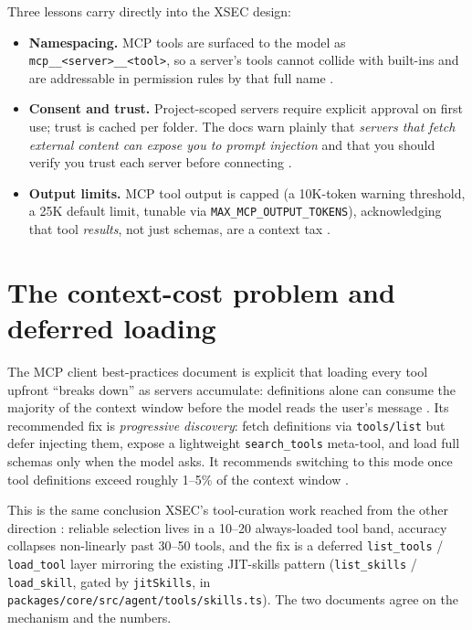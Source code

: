 \documentclass[11pt]{article}
\begin{document}
Three lessons carry directly into the XSEC design:
\begin{itemize}[leftmargin=*]
  \item \textbf{Namespacing.} MCP tools are surfaced to the model as
  \texttt{mcp\_\_<server>\_\_<tool>}, so a server's tools cannot collide with
  built-ins and are addressable in permission rules by that full name
  \cite{claudecode-mcp}.
  \item \textbf{Consent and trust.} Project-scoped servers require explicit
  approval on first use; trust is cached per folder. The docs warn plainly that
  \emph{servers that fetch external content can expose you to prompt injection}
  and that you should verify you trust each server before connecting
  \cite{claudecode-mcp}.
  \item \textbf{Output limits.} MCP tool output is capped (a 10K-token warning
  threshold, a 25K default limit, tunable via \texttt{MAX\_MCP\_OUTPUT\_TOKENS}),
  acknowledging that tool \emph{results}, not just schemas, are a context tax
  \cite{claudecode-mcp}.
\end{itemize}

\section{The context-cost problem and deferred loading}

The MCP client best-practices document is explicit that loading every tool
upfront ``breaks down'' as servers accumulate: definitions alone can consume the
majority of the context window before the model reads the user's message
\cite{mcp-clientbp}. Its recommended fix is \emph{progressive discovery}: fetch
definitions via \texttt{tools/list} but defer injecting them, expose a
lightweight \texttt{search\_tools} meta-tool, and load full schemas only when the
model asks. It recommends switching to this mode once tool definitions exceed
roughly 1--5\% of the context window \cite{mcp-clientbp}.

This is the same conclusion XSEC's tool-curation work reached from the other
direction \cite{tool-curation}: reliable selection lives in a 10--20 always-loaded
tool band, accuracy collapses non-linearly past 30--50 tools, and the fix is a
deferred \texttt{list\_tools} / \texttt{load\_tool} layer mirroring the existing
JIT-skills pattern (\texttt{list\_skills} / \texttt{load\_skill}, gated by
\texttt{jitSkills}, in \texttt{packages/core/src/agent/tools/skills.ts}). The two
documents agree on the mechanism and the numbers.
\end{document}
